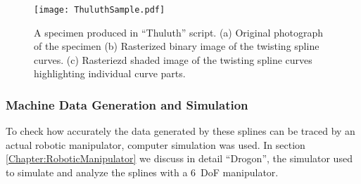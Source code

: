 \begin{figure}
  \centering
  \texttt{[image: ThuluthSample.pdf]}
  \caption{A specimen produced in ``Thuluth'' script. (a) Original photograph of the specimen (b) Rasterized binary image of the twisting spline curves. (c) Rasteriezd shaded image of the twisting spline curves highlighting individual curve parts.
  }
  \label{Fig:Thuluth}
\end{figure}

\subsubsection{Machine Data Generation and Simulation}
To check how accurately the data generated by these splines can be traced by an actual robotic manipulator, computer simulation was used. In section \ref{Chapter:RoboticManipulator} we discuss in detail ``Drogon'', the simulator used to simulate and analyze the splines with a $6$~DoF manipulator.

\clearpage        
